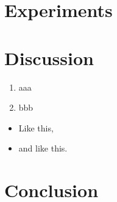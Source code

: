 \documentclass{article}
\begin{document}
\section{Experiments}

\section{Discussion}

\begin{enumerate}
\item aaa
\item bbb
\end{enumerate}

\begin{itemize}
\item Like this,
\item and like this.
\end{itemize}

\section{Conclusion}



\end{document}

